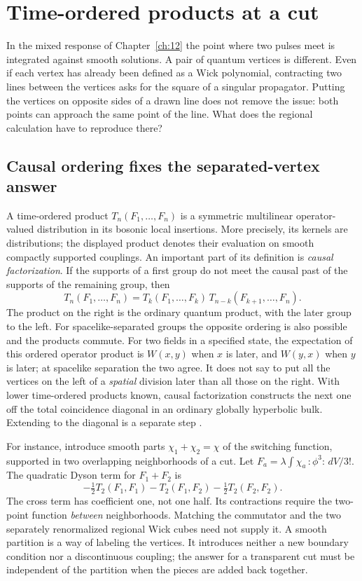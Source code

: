 \chapter{Time-ordered products at a cut}\label{ch:13}
In the mixed response of Chapter~\ref{ch:12} the point where two pulses
meet is integrated against smooth solutions. A pair of quantum vertices is
different. Even if each vertex has already been defined as a Wick
polynomial, contracting two lines between the vertices asks for the square
of a singular propagator. Putting the vertices on opposite sides of a drawn
line does not remove the issue: both points can approach the same point of
the line. What does the regional calculation have to reproduce there?

\section{Causal ordering fixes the separated-vertex answer}
A time-ordered product $T_n(F_1,\ldots,F_n)$ is a symmetric multilinear
operator-valued distribution in its bosonic local insertions. More
precisely, its kernels are distributions; the displayed product denotes
their evaluation on smooth compactly supported couplings. An important
part of its definition is \emph{causal factorization}. If the supports of
a first group do not meet the causal past of the supports of the remaining
group, then
\begin{equation}
 T_n(F_1,\ldots,F_n)=
 T_k(F_1,\ldots,F_k)\,T_{n-k}(F_{k+1},\ldots,F_n).
 \label{eq:13-causal}
\end{equation}
The product on the right is the ordinary quantum product, with the later
group to the left. For spacelike-separated groups the opposite ordering is
also possible and the products commute. For two fields in a specified
state, the expectation of this ordered operator product is $W(x,y)$ when
$x$ is later, and $W(y,x)$ when $y$ is later;
at spacelike separation the two agree. It does not say to put all the
vertices on the left of a \emph{spatial} division later than all those on
the right. With lower time-ordered products known, causal factorization
constructs the next one off the total coincidence diagonal in an ordinary
globally hyperbolic bulk. Extending to the diagonal is a separate step
\cite{BF,HWT,FR}.

For instance, introduce smooth parts $\chi_1+\chi_2=\chi$ of the
switching function, supported in two overlapping neighborhoods of a cut.
Let $F_a=\lambda\int\chi_a\,:\!\phi^3\!:\,dV/3!$. The quadratic Dyson
term for $F_1+F_2$ is
\[
 -\tfrac12 T_2(F_1,F_1)-T_2(F_1,F_2)-\tfrac12 T_2(F_2,F_2).
\]
The cross term has coefficient one, not one half. Its contractions require
the two-point function \emph{between} neighborhoods. Matching the
commutator and the two separately renormalized regional Wick cubes need
not supply it. A smooth partition is a way of labeling the vertices. It
introduces neither a new boundary condition nor a discontinuous coupling;
the answer for a transparent cut must be independent of the partition when
the pieces are added back together.

